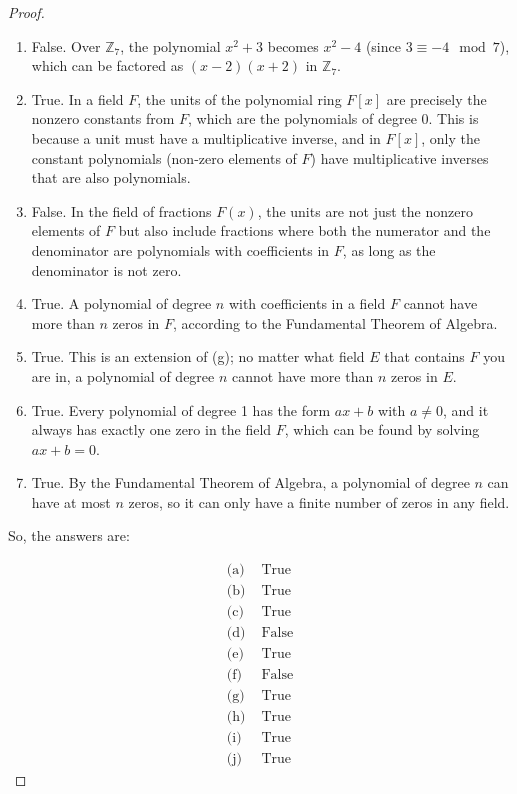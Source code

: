 \documentclass[12pt]{amsart}
\theoremstyle{definition}
\numberwithin{equation}{section}
\theoremstyle{plain}
\begin{document}
\begin{exercise}{25}
\begin{proof}
\begin{enumerate}[label=(\alph*.)]
    \item False. Over \( \mathbb{Z}_7 \), the polynomial \( x^2 + 3 \) becomes \( x^2 - 4 \) (since \( 3 \equiv -4 \mod 7 \)), which can be factored as \( (x - 2)(x + 2) \) in \( \mathbb{Z}_7 \).
    
    \item True. In a field \( F \), the units of the polynomial ring \( F[x] \) are precisely the nonzero constants from \( F \), which are the polynomials of degree 0. This is because a unit must have a multiplicative inverse, and in \( F[x] \), only the constant polynomials (non-zero elements of \( F \)) have multiplicative inverses that are also polynomials.
    
    \item False. In the field of fractions \( F(x) \), the units are not just the nonzero elements of \( F \) but also include fractions where both the numerator and the denominator are polynomials with coefficients in \( F \), as long as the denominator is not zero.
    
    \item True. A polynomial of degree \( n \) with coefficients in a field \( F \) cannot have more than \( n \) zeros in \( F \), according to the Fundamental Theorem of Algebra.
    
    \item True. This is an extension of (g); no matter what field \( E \) that contains \( F \) you are in, a polynomial of degree \( n \) cannot have more than \( n \) zeros in \( E \).
    
    \item True. Every polynomial of degree 1 has the form \( ax + b \) with \( a \neq 0 \), and it always has exactly one zero in the field \( F \), which can be found by solving \( ax + b = 0 \).
    
    \item True. By the Fundamental Theorem of Algebra, a polynomial of degree \( n \) can have at most \( n \) zeros, so it can only have a finite number of zeros in any field.
\end{enumerate}

So, the answers are:


\begin{align*}
\text{(a)} & \text{ True} \\
\text{(b)} & \text{ True} \\
\text{(c)} & \text{ True} \\
\text{(d)} & \text{ False} \\
\text{(e)} & \text{ True} \\
\text{(f)} & \text{ False} \\
\text{(g)} & \text{ True} \\
\text{(h)} & \text{ True} \\
\text{(i)} & \text{ True} \\
\text{(j)} & \text{ True}
\end{align*}
\end{proof}
\end{exercise}
\end{document}
